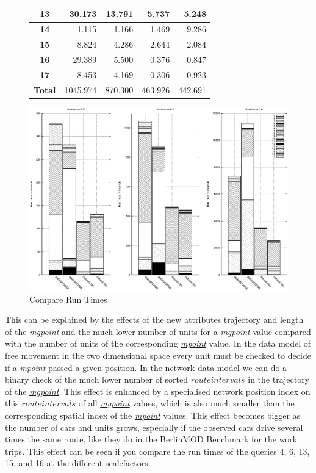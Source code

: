\documentclass[a4paper]{article}
\newcommand{\bmodb} {BerlinMOD Benchmark}
\newcommand{\dt}[1]{\textsl{\underline{#1}}}
\begin{document}
\begin{figure}[h]
\begin{minipage}{0.5\linewidth}
\begin{tiny}
\begin{tabular}{|c|r|r|r|r|}
        \hline
        \textbf{13}&30.173&13.791&5.737&5.248\\
        \hline
        \textbf{14}&1.115&1.166&1.469&9.286\\
        \hline
        \textbf{15}&8.824&4.286&2.644&2.084\\
        \hline
        \textbf{16}&29.389&5.500&0.376&0.847\\
        \hline
        \textbf{17}&8.453&4.169&0.306&0.923\\
        \hline
        \textbf{Total}&1045.974&870.300&463,926&442.691\\
        \hline
      \end{tabular}
    \end{tiny}
  \end{minipage}\hfill
  \begin{minipage}{0.5\textwidth}
      \includegraphics[width=1.0\linewidth]{compruntimesall.eps}
  \end{minipage}
 \caption{Compare Run Times}
 \label{fig:compruntimes}
\end{figure}

This can be explained by the effects of the new attributes trajectory and length
of the \dt{mgpoint} and the much lower number of units for a \dt{mgpoint} value
compared with the number of units of the corresponding \dt{mpoint} value.
In the data model of free movement in the two dimensional space every
unit must be checked to decide if a \dt{mpoint} passed a given position.
In the network data model we can do a binary check of the much
lower number of sorted $route intervals$ in the trajectory of the \dt{mgpoint}.
This effect is enhanced by a specialised network position index on this
$route intervals$ of all \dt{mgpoint} values, which is also much smaller than
the corresponding spatial index of the \dt{mpoint} values.
This effect becomes bigger as the number of cars and units grows, especially if the
observed cars drive several times the same route, like they do in the \bmodb{}
for the work trips. This effect can be seen if you compare the run times of the
queries 4, 6, 13, 15, and 16 at the different scalefactors.
\end{document}
